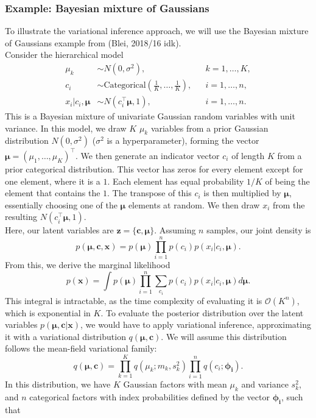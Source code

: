 \documentclass[a4paper,12pt]{article}
\begin{document}
\subsubsection{Example: Bayesian mixture of Gaussians}
To illustrate the variational inference approach, we will use the Bayesian mixture of Gaussians example from (Blei, 2018/16 idk).\\
Consider the hierarchical model
\begin{align*}
\mu_k&\sim N(0,\sigma^2), &&k=1,\dots,K,\\
c_i&\sim \text{Categorical}\left(\frac{1}{K},\dots,\frac{1}{K}\right), &&i=1,\dots,n,\\
x_i|c_i,\bm{\mu}&\sim N(c^\top_i\bm{\mu},1), &&i=1,\dots,n.
\end{align*}
This is a Bayesian mixture of univariate Gaussian random variables with unit variance. In this model, we draw $K$ $\mu_k$ variables from a prior Gaussian distribution $N(0,\sigma^2)$ ($\sigma^2$ is a hyperparameter), forming the vector $\bm{\mu}=(\mu_1,\dots,\mu_K)^\top$. We then generate an indicator vector $c_i$ of length $K$ from a prior categorical distribution. This vector has zeros for every element except for one element, where it is a $1$. Each element has equal probability $1/K$ of being the element that contains the $1$. The transpose of this $c_i$ is then multiplied by $\bm{\mu}$, essentially choosing one of the $\bm{\mu}$ elements at random. We then draw $x_i$ from the resulting $N(c^\top_i\bm{\mu},1)$.\\
Here, our latent variables are $\textbf{z}=\{\textbf{c},\bm{\mu}\}$. Assuming $n$ samples, our joint density is
\begin{equation}
p(\bm{\mu},\textbf{c},\textbf{x})=p(\bm{\mu})\prod^n_{i=1}p(c_i)p(x_i|c_i, \bm{\mu}).\end{equation}
From this, we derive the marginal likelihood
\[p(\textbf{x})=\int p(\bm{\mu})\prod^n_{i=1}\sum_{c_i}p(c_i)p(x_i|c_i,\bm{\mu})d\bm{\mu}.\]
This integral is intractable, as the time complexity of evaluating it is $\mathcal{O}(K^n)$, which is exponential in $K$. To evaluate the posterior distribution over the latent variables $p(\bm{\mu},\textbf{c}|\textbf{x})$, we would have to apply variational inference, approximating it with a variational distribution $q(\bm{\mu},\textbf{c})$. We will assume this distribution follows the mean-field variational family:
\[q(\bm{\mu},\textbf{c})=\prod^K_{k=1}q(\mu_k;m_k,s^2_k)\prod^n_{i=1}q(c_i;\bm{\phi_i}).\]
In this distribution, we have $K$ Gaussian factors with mean $\mu_k$ and variance $s^2_k$, and $n$ categorical factors with index probabilities defined by the vector $\bm{\phi_i}$, such that
\end{document}

